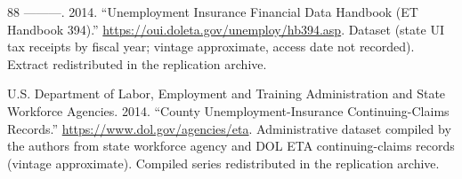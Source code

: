 \documentclass[12pt]{article}
\newcommand{\1}{\mathbf{1}}
\begin{document}
\begin{thebibliography}{88}
---{}---{}---. 2014.
\newblock \enquote{Unemployment Insurance Financial Data Handbook ({ET} Handbook 394).}
\newblock \urlprefix\url{https://oui.doleta.gov/unemploy/hb394.asp}.
\newblock Dataset (state {UI} tax receipts by fiscal year; vintage approximate, access date not recorded). Extract redistributed in the replication archive.

{U.S. Department of Labor, Employment and Training Administration and State Workforce Agencies}. 2014.
\newblock \enquote{County Unemployment-Insurance Continuing-Claims Records.}
\newblock \urlprefix\url{https://www.dol.gov/agencies/eta}.
\newblock Administrative dataset compiled by the authors from state workforce agency and {DOL} {ETA} continuing-claims records (vintage approximate). Compiled series redistributed in the replication archive.

\end{thebibliography}


\pagebreak
\end{document}
